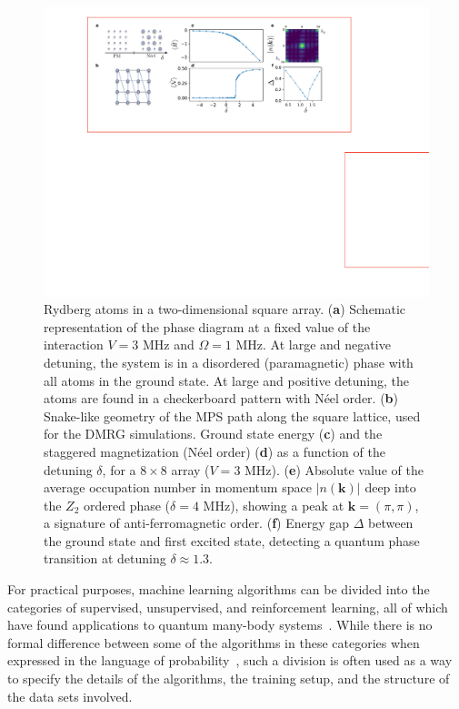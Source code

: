\documentclass[twocolumn,english,reprint,superscriptaddress,longbibliography,pra]{revtex4-1}
\begin{document}
\begin{figure}[t]
\noindent \centering{}\includegraphics[width=2.05\columnwidth]{Fig1}
\caption{Rydberg atoms in a two-dimensional square array. ({\bf a}) Schematic representation of the phase diagram at a fixed value of the interaction $V=3$ MHz and $\Omega = 1$ MHz. At large and negative detuning, the system is in a disordered (paramagnetic) phase with all atoms in the ground state. At large and positive detuning, the atoms are found in a checkerboard pattern with N\'eel order. ({\bf b}) Snake-like geometry of the MPS path along the square lattice, used for the DMRG simulations. Ground state energy ({\bf c}) and the staggered magnetization (N\'eel order) ({\bf d}) as a function of the detuning $\delta$, for a $8\times8$ array ($V=3$ MHz). ({\bf e}) Absolute value of the average occupation number in momentum space $|n(\bm{k})|$ deep into the $Z_2$ ordered phase ($\delta=4$ MHz), showing a peak at $\bm{k}=(\pi,\pi)$, a signature of anti-ferromagnetic order. ({\bf f}) Energy gap $\Delta$ between the ground state and first excited state, detecting a quantum phase transition at detuning $\delta\approx1.3$.}
\label{Fig::1} 
\end{figure}

For practical purposes, machine learning algorithms can be divided into the categories of supervised, unsupervised, and reinforcement learning, all of which have found applications to quantum many-body systems~\cite{doi:10.1080/23746149.2020.1797528}. While there is no formal difference between some of the algorithms in these categories when expressed in the language of probability~\cite{Goodfellow-et-al-2016,10.5555/1162264}, such a division is often used as a way to specify the details of the algorithms, the training setup, and the structure of the data sets involved. 
\end{document}

